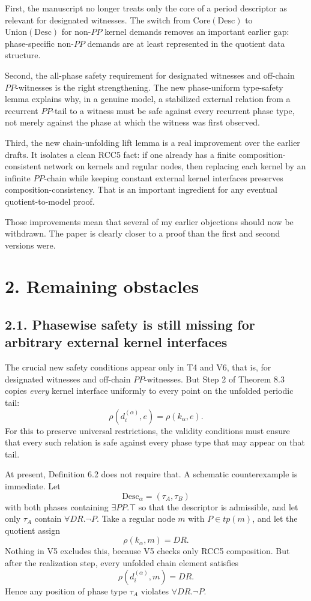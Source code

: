 \documentclass[11pt]{article}
\begin{document}
First, the manuscript no longer treats only the core of a period descriptor as relevant for designated witnesses. The switch from \(\mathrm{Core}(\mathrm{Desc})\) to \(\mathrm{Union}(\mathrm{Desc})\) for non-\(PP\) kernel demands removes an important earlier gap: phase-specific non-\(PP\) demands are at least represented in the quotient data structure.

Second, the all-phase safety requirement for designated witnesses and off-chain \(PP\)-witnesses is the right strengthening. The new phase-uniform type-safety lemma explains why, in a genuine model, a stabilized external relation from a recurrent \(PP\)-tail to a witness must be safe against every recurrent phase type, not merely against the phase at which the witness was first observed.

Third, the new chain-unfolding lift lemma is a real improvement over the earlier drafts. It isolates a clean RCC5 fact: if one already has a finite composition-consistent network on kernels and regular nodes, then replacing each kernel by an infinite \(PP\)-chain while keeping constant external kernel interfaces preserves composition-consistency. That is an important ingredient for any eventual quotient-to-model proof.

Those improvements mean that several of my earlier objections should now be withdrawn. The paper is clearly closer to a proof than the first and second versions were.

\section*{2. Remaining obstacles}

\subsection*{2.1. Phasewise safety is still missing for arbitrary external kernel interfaces}

The crucial new safety conditions appear only in T4 and V6, that is, for designated witnesses and off-chain \(PP\)-witnesses. But Step 2 of Theorem 8.3 copies \emph{every} kernel interface uniformly to every point on the unfolded periodic tail:
\[
\rho(d_i^{(\alpha)},e)=\rho(k_\alpha,e).
\]
For this to preserve universal restrictions, the validity conditions must ensure that every such relation is safe against every phase type that may appear on that tail.

At present, Definition 6.2 does not require that. A schematic counterexample is immediate. Let
\[
\mathrm{Desc}_\alpha=(\tau_A,\tau_B)
\]
with both phases containing \(\exists PP.\top\) so that the descriptor is admissible, and let only \(\tau_A\) contain \(\forall DR.\neg P\). Take a regular node \(m\) with \(P\in tp(m)\), and let the quotient assign
\[
\rho(k_\alpha,m)=DR.
\]
Nothing in V5 excludes this, because V5 checks only RCC5 composition. But after the realization step, every unfolded chain element satisfies
\[
\rho(d_i^{(\alpha)},m)=DR.
\]
Hence any position of phase type \(\tau_A\) violates \(\forall DR.\neg P\).
\end{document}
